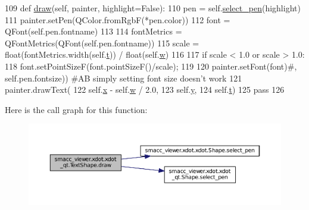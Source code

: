 \begin{DoxyCode}
109     \textcolor{keyword}{def }\hyperlink{classsmacc__viewer_1_1xdot_1_1xdot__qt_1_1TextShape_a537309c0d79757c555e79cfb190be5ec}{draw}(self, painter, highlight=False):
110         pen = self.\hyperlink{classsmacc__viewer_1_1xdot_1_1xdot__qt_1_1Shape_a7f20c9ecdb3c6117b8d1185c8155b122}{select\_pen}(highlight)
111         painter.setPen(QColor.fromRgbF(*pen.color))
112         font = QFont(self.pen.fontname)
113 
114         fontMetrics = QFontMetrics(QFont(self.pen.fontname))
115         scale = float(fontMetrics.width(self.\hyperlink{classsmacc__viewer_1_1xdot_1_1xdot__qt_1_1TextShape_a355e76c951da6ca7af4a69b6eaeea2e8}{t})) / float(self.\hyperlink{classsmacc__viewer_1_1xdot_1_1xdot__qt_1_1TextShape_a7af76f9d10ceafd1209cf7bfce73c7be}{w})
116 
117         \textcolor{keywordflow}{if} scale < 1.0 \textcolor{keywordflow}{or} scale > 1.0:
118             font.setPointSizeF(font.pointSizeF()/scale);
119 
120         painter.setFont(font)\textcolor{comment}{#, self.pen.fontsize)) #AB simply setting font size doesn't work}
121         painter.drawText(
122                 self.\hyperlink{classsmacc__viewer_1_1xdot_1_1xdot__qt_1_1TextShape_a5ef1c12aaeabfc80fbe893b6a5f9c3d3}{x} - self.\hyperlink{classsmacc__viewer_1_1xdot_1_1xdot__qt_1_1TextShape_a7af76f9d10ceafd1209cf7bfce73c7be}{w} / 2.0,
123                 self.\hyperlink{classsmacc__viewer_1_1xdot_1_1xdot__qt_1_1TextShape_ae50d05feb01bc8e1544cb9c8c6a312f1}{y},
124                 self.\hyperlink{classsmacc__viewer_1_1xdot_1_1xdot__qt_1_1TextShape_a355e76c951da6ca7af4a69b6eaeea2e8}{t})
125         \textcolor{keywordflow}{pass}
126 
\end{DoxyCode}


Here is the call graph for this function\+:
\nopagebreak
\begin{figure}[H]
\begin{center}
\leavevmode
\includegraphics[width=350pt]{classsmacc__viewer_1_1xdot_1_1xdot__qt_1_1TextShape_a537309c0d79757c555e79cfb190be5ec_cgraph}
\end{center}
\end{figure}




